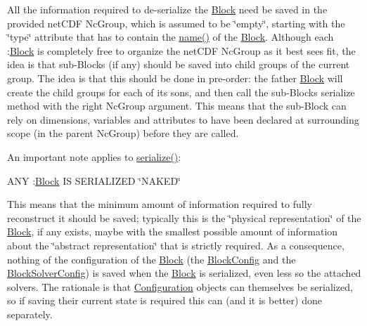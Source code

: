 All the information required to de-\/serialize the \mbox{\hyperlink{class_s_m_spp__di__unipi__it_1_1_block}{Block}} need be saved in the provided net\+C\+DF Nc\+Group, which is assumed to be \char`\"{}empty\char`\"{}, starting with the \char`\"{}type\char`\"{} attribute that has to contain the \mbox{\hyperlink{class_s_m_spp__di__unipi__it_1_1_block_a738e9dfd6e00507da219e4bd5a3f6be9}{name()}} of the \mbox{\hyperlink{class_s_m_spp__di__unipi__it_1_1_block}{Block}}. Although each \+:\mbox{\hyperlink{class_s_m_spp__di__unipi__it_1_1_block}{Block}} is completely free to organize the net\+C\+DF Nc\+Group as it best sees fit, the idea is that sub-\/\+Blocks (if any) should be saved into child groups of the current group. The idea is that this should be done in pre-\/order\+: the father \mbox{\hyperlink{class_s_m_spp__di__unipi__it_1_1_block}{Block}} will create the child groups for each of its sons, and then call the sub-\/\+Block\textquotesingle{}s serialize method with the right Nc\+Group argument. This means that the sub-\/\+Block can rely on dimensions, variables and attributes to have been declared at surrounding scope (in the parent Nc\+Group) before they are called.

An important note applies to \mbox{\hyperlink{class_s_m_spp__di__unipi__it_1_1_block_a8209df4072912666c1ea5f6979c035fc}{serialize()}}\+:


\begin{DoxyItemize}
\item A\+NY \+:\mbox{\hyperlink{class_s_m_spp__di__unipi__it_1_1_block}{Block}} IS S\+E\+R\+I\+A\+L\+I\+Z\+ED \char`\"{}\+N\+A\+K\+E\+D\char`\"{}

This means that the minimum amount of information required to fully reconstruct it should be saved; typically this is the \char`\"{}physical
  representation\char`\"{} of the \mbox{\hyperlink{class_s_m_spp__di__unipi__it_1_1_block}{Block}}, if any exists, maybe with the smallest possible amount of information about the \char`\"{}abstract representation\char`\"{} that is strictly required. As a consequence, nothing of the configuration of the \mbox{\hyperlink{class_s_m_spp__di__unipi__it_1_1_block}{Block}} (the \mbox{\hyperlink{class_s_m_spp__di__unipi__it_1_1_block_config}{Block\+Config}} and the \mbox{\hyperlink{class_s_m_spp__di__unipi__it_1_1_block_solver_config}{Block\+Solver\+Config}}) is saved when the \mbox{\hyperlink{class_s_m_spp__di__unipi__it_1_1_block}{Block}} is serialized, even less so the attached solvers. The rationale is that \mbox{\hyperlink{class_s_m_spp__di__unipi__it_1_1_configuration}{Configuration}} objects can themselves be serialized, so if saving their current state is required this can (and it is better) done separately.
\end{DoxyItemize}

